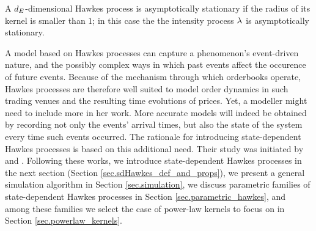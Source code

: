 \documentclass[10pt, article,table]{article}
\begin{document}
A $\numEventTypes$-dimensional Hawkes process is asymptotically stationary if the radius of its kernel is smaller than $1$; in this case the the intensity process $\intensity[ ]$ is asymptotically stationary.  

A model based on Hawkes processes can capture a phenomenon's event-driven nature, and the possibly complex ways in which past events affect the occurence of future events. Because of the mechanism through which orderbooks operate, Hawkes processes are therefore well suited to model order dynamics in such trading venues and the resulting time evolutions of prices. Yet, a modeller might need to include more in her work. More accurate models will indeed be obtained by recording not only the events' arrival times, but also the state of the system every time such events occurred. The rationale for introducing state-dependent Hawkes processes is based on this additional need. Their study was initiated by \citealp{MP20hyb} and \citealp{MP18sta}. Following these works, we introduce state-dependent Hawkes  processes in the next section (Section \ref{sec.sdHawkes_def_and_props}), we present a general simulation algorithm in Section \ref{sec.simulation},  we discuss parametric families of state-dependent Hawkes processes in Section \ref{sec.parametric_hawkes}, and among these families we select the case of power-law kernels to focus on in Section \ref{sec.powerlaw_kernels}.
\end{document}
